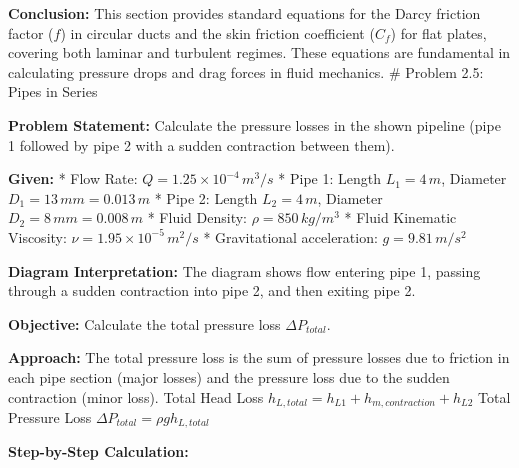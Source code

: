 \textbf{Conclusion:} This section provides standard equations for the
Darcy friction factor (\(f\)) in circular ducts and the skin friction
coefficient (\(C_f\)) for flat plates, covering both laminar and
turbulent regimes. These equations are fundamental in calculating
pressure drops and drag forces in fluid mechanics. \# Problem 2.5: Pipes
in Series

\textbf{Problem Statement:} Calculate the pressure losses in the shown
pipeline (pipe 1 followed by pipe 2 with a sudden contraction between
them).

\textbf{Given:} * Flow Rate: \(Q = 1.25 \times 10^{-4} \, m^3/s\) * Pipe
1: Length \(L_1 = 4 \, m\), Diameter \(D_1 = 13 \, mm = 0.013 \, m\) *
Pipe 2: Length \(L_2 = 4 \, m\), Diameter \(D_2 = 8 \, mm = 0.008 \, m\)
* Fluid Density: \(\rho = 850 \, kg/m^3\) * Fluid Kinematic Viscosity:
\(\nu = 1.95 \times 10^{-5} \, m^2/s\) * Gravitational acceleration:
\(g = 9.81 \, m/s^2\)

\textbf{Diagram Interpretation:} The diagram shows flow entering pipe 1,
passing through a sudden contraction into pipe 2, and then exiting pipe
2.

\textbf{Objective:} Calculate the total pressure loss
\(\Delta P_{total}\).

\textbf{Approach:} The total pressure loss is the sum of pressure losses
due to friction in each pipe section (major losses) and the pressure
loss due to the sudden contraction (minor loss). Total Head Loss
\(h_{L, total} = h_{L1} + h_{m, contraction} + h_{L2}\) Total Pressure
Loss \(\Delta P_{total} = \rho g h_{L, total}\)

\textbf{Step-by-Step Calculation:}

